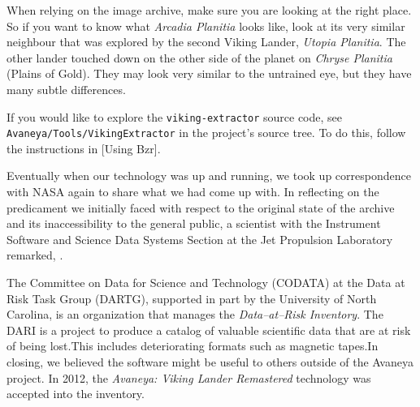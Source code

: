 When relying on the image archive, make sure you are looking at the right place. So if you want to know what {\it Arcadia Planitia} looks like, look at its very similar neighbour that was explored by the second Viking Lander, {\it Utopia Planitia}. The other lander touched down on the other side of the planet on {\it Chryse Planitia} (Plains of Gold). They may look very similar to the untrained eye, but they have many subtle differences.

If you would like to explore the {\tt viking-extractor} source code, see {\tt Avaneya/Tools/VikingExtractor} in the project's source tree. To do this, follow the instructions in [Using Bzr].


Eventually when our technology was up and running, we took up correspondence with NASA again to share what we had come up with. In reflecting on the predicament we initially faced with respect to the original state of the archive and its inaccessibility to the general public, a scientist with the Instrument Software and Science Data Systems Section at the Jet Propulsion Laboratory remarked, .

The Committee on Data for Science and Technology (CODATA) at the Data at Risk Task Group (DARTG), supported in part by the University of North Carolina, is an organization that manages the {\it Data--at--Risk Inventory}. The DARI is a project to produce a catalog of valuable scientific data that are at risk of being lost.\footnotecite[murillo2012] This includes deteriorating formats such as magnetic tapes. In closing, we believed the software might be useful to others outside of the Avaneya project. In 2012, the {\it Avaneya: Viking Lander Remastered} technology was accepted into the inventory.

\StopChapter

